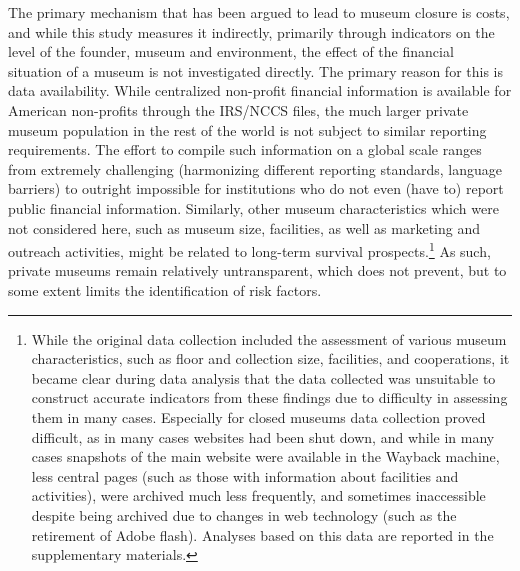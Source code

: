 \documentclass[12pt]{article}
\begin{document}
The primary mechanism that has been argued to lead to museum closure is costs, and while this study measures it indirectly, primarily through indicators on the level of the founder, museum and environment, the effect of the financial situation of a museum is not investigated directly.
The primary reason for this is data availability.
While centralized non-profit financial information is available for American non-profits through the IRS/NCCS files, the much larger private museum population in the rest of the world is not subject to similar reporting requirements.
The effort to compile such information on a global scale ranges from extremely challenging (harmonizing different reporting standards, language barriers) to outright impossible for institutions who do not even (have to) report public financial information.
Similarly, other museum characteristics which were not considered here, such as museum size, facilities, as well as marketing and outreach activities, might be related to long-term survival prospects.\footnote{While the original data collection included the assessment of various museum characteristics, such as floor and collection size, facilities, and cooperations, it became clear during data analysis that the data collected was unsuitable to construct accurate indicators from these findings due to difficulty in assessing them in many cases. Especially for closed museums data collection proved difficult, as in many cases websites had been shut down, and while in many cases snapshots of the main website were available in the Wayback machine, less central pages (such as those with information about facilities and activities), were archived much less frequently, and sometimes inaccessible despite being archived due to changes in web technology (such as the retirement of Adobe flash). Analyses based on this data are reported in the supplementary materials.}
As such, private museums remain relatively untransparent, which does not prevent, but to some extent limits the identification of risk factors. 
\end{document}

